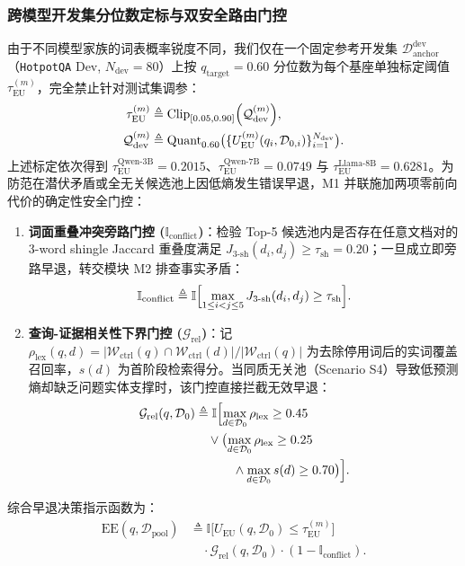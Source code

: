 \documentclass[11pt]{article}
\begin{document}
\subsubsection{跨模型开发集分位数定标与双安全路由门控}
由于不同模型家族的词表概率锐度不同，我们仅在一个固定参考开发集 $\mathcal{D}_{\text{anchor}}^{\text{dev}}$（\texttt{HotpotQA} Dev, $N_{\text{dev}} = 80$）上按 $q_{\text{target}} = 0.60$ 分位数为每个基座单独标定阈值 $\tau_{\text{EU}}^{(m)}$，完全禁止针对测试集调参：
\begin{align}
\tau_{\text{EU}}^{(m)} &\triangleq \text{Clip}_{[0.05, 0.90]}\Bigl( \mathcal{Q}_{\text{dev}}^{(m)} \Bigr), \label{eq:zh_m1_anchor} \\
\mathcal{Q}_{\text{dev}}^{(m)} &\triangleq \mathrm{Quant}_{0.60}\bigl(\{ U_{\text{EU}}^{(m)}(q_i, \mathcal{D}_{0,i}) \}_{i=1}^{N_{\text{dev}}}\bigr). \nonumber
\end{align}
上述标定依次得到 $\tau_{\text{EU}}^{\text{Qwen-3B}} = 0.2015$、$\tau_{\text{EU}}^{\text{Qwen-7B}} = 0.0749$ 与 $\tau_{\text{EU}}^{\text{Llama-8B}} = 0.6281$。为防范在潜伏矛盾或全无关候选池上因低熵发生错误早退，M1 并联施加两项零前向代价的确定性安全门控：
\begin{enumerate}[leftmargin=*,nosep]
    \item \textbf{词面重叠冲突旁路门控 ($\mathbb{I}_{\text{conflict}}$)}：检验 Top-5 候选池内是否存在任意文档对的 3-word shingle Jaccard 重叠度满足 $J_{3\text{-sh}}(d_i, d_j) \ge \tau_{\text{sh}} = 0.20$；一旦成立即旁路早退，转交模块 M2 排查事实矛盾：
    \begin{equation}
    \mathbb{I}_{\text{conflict}} \triangleq \mathbb{I}\Bigl[ \max_{1 \le i < j \le 5} J_{3\text{-sh}}(d_i, d_j) \ge \tau_{\text{sh}} \Bigr].
    \label{eq:zh_m1_bypass}
    \end{equation}
    \item \textbf{查询-证据相关性下界门控 ($\mathcal{G}_{\text{rel}}$)}：记 $\rho_{\text{lex}}(q, d) = |\mathcal{W}_{\text{ctrl}}(q) \cap \mathcal{W}_{\text{ctrl}}(d)| / |\mathcal{W}_{\text{ctrl}}(q)|$ 为去除停用词后的实词覆盖召回率，$s(d)$ 为首阶段检索得分。当同质无关池（Scenario S4）导致低预测熵却缺乏问题实体支撑时，该门控直接拦截无效早退：
    \begin{align}
    \mathcal{G}_{\text{rel}}(q, \mathcal{D}_0) &\triangleq \mathbb{I}\Bigl[ \max_{d \in \mathcal{D}_0}\rho_{\text{lex}} \ge 0.45 \nonumber \\
    &\quad \lor \bigl(\max_{d \in \mathcal{D}_0}\rho_{\text{lex}} \ge 0.25 \nonumber \\
    &\qquad\quad \land \max_{d \in \mathcal{D}_0} s(d) \ge 0.70\bigr) \Bigr].
    \label{eq:zh_m1_rel_gate}
    \end{align}
\end{enumerate}
综合早退决策指示函数为：
\begin{align}
\text{EE}(q, \mathcal{D}_{\text{pool}}) &\triangleq \mathbb{I}\bigl[U_{\text{EU}}(q, \mathcal{D}_0) \le \tau_{\text{EU}}^{(m)}\bigr] \nonumber \\
&\quad \cdot \mathcal{G}_{\text{rel}}(q, \mathcal{D}_0) \cdot (1 - \mathbb{I}_{\text{conflict}}).
\label{eq:zh_m1_ee}
\end{align}
\end{document}
